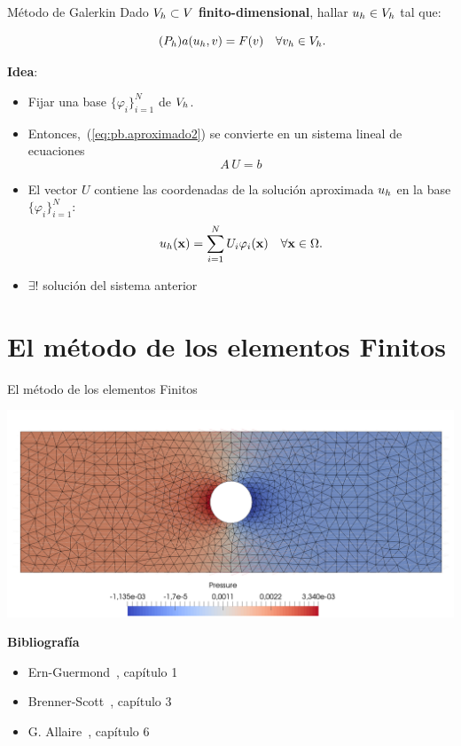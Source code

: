 \documentclass[10pt,leqno]{beamer}
\begin{document}
\begin{frame}{Método de Galerkin}
  Dado $V_h\subset V$ \textbf{finito-dimensional}, hallar $u_{h}\in V_h$ tal que:
  \begin{block}{}
    \vspace{-2.5ex}
    \begin{equation}
      \label{eq:pb.aproximado2}
      \tag{$P_h$}
      a(u_{h},v)= F(v) \quad \forall v_{h} \in V_h.
    \end{equation}
  \end{block}

  \textbf{Idea}:
  \begin{itemize}
  \item Fijar una base $\{\varphi_i\}_{i=1}^N$ de $V_h$.
  \item Entonces,~(\ref{eq:pb.aproximado2}) se convierte en un sistema
    lineal de ecuaciones
    $$A\, U = b$$
  \item El vector $U$ contiene las coordenadas de la solución
    aproximada $u_{h}$ en la base $\{\varphi_i\}_{i=1}^N$:
    $$
    u_{h}(\mathbf{x}) = \sum_{i=1}^N U_i \varphi_i(\mathbf{x})\quad\forall\mathbf{x}\in\Omega.
    $$
  \item $\exists!$ solución del sistema anterior
  \end{itemize}
\end{frame}

\section{El método de los elementos Finitos}

\begin{frame}{El método de los elementos Finitos}
  \begin{center}
    \includegraphics[width=0.99\linewidth]{mef}
  \end{center}
  \bigskip
  \textbf{Bibliografía}
  \small
  \begin{itemize}
  \item Ern-Guermond~\cite{Ern-Guermond:04}, capítulo 1
  \item Brenner-Scott~\cite{Brenner-Scott:08}, capítulo 3
  \item G. Allaire~\cite{allaire_numerical_2007}, capítulo 6
  \end{itemize}
\end{frame}
\end{document}
